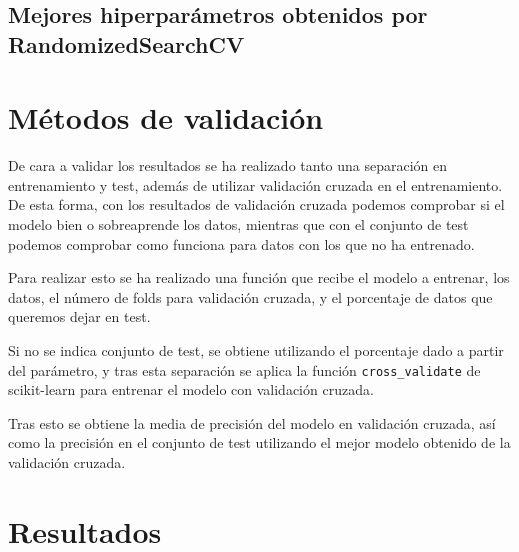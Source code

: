 \subsection{Mejores hiperparámetros obtenidos por RandomizedSearchCV}


\section{Métodos de validación}

De cara a validar los resultados se ha realizado tanto una separación en entrenamiento y test, además de utilizar validación cruzada en el entrenamiento. De esta forma, con los resultados de validación cruzada podemos comprobar si el modelo bien o sobreaprende los datos, mientras que con el conjunto de test podemos comprobar como funciona para datos con los que no ha entrenado.

Para realizar esto se ha realizado una función que recibe el modelo a entrenar, los datos, el número de folds para validación cruzada, y el porcentaje de datos que queremos dejar en test.

Si no se indica conjunto de test, se obtiene utilizando el porcentaje dado a partir del parámetro, y tras esta separación se aplica la función \texttt{cross\_validate} de scikit-learn para entrenar el modelo con validación cruzada.

Tras esto se obtiene la media de precisión del modelo en validación cruzada, así como la precisión en el conjunto de test utilizando el mejor modelo obtenido de la validación cruzada.

\section{Resultados}
